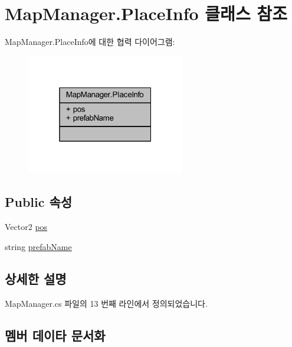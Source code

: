 \hypertarget{class_map_manager_1_1_place_info}{}\section{Map\+Manager.\+Place\+Info 클래스 참조}
\label{class_map_manager_1_1_place_info}


Map\+Manager.\+Place\+Info에 대한 협력 다이어그램\+:\nopagebreak
\begin{figure}[H]
\begin{center}
\leavevmode
\includegraphics[width=196pt]{class_map_manager_1_1_place_info__coll__graph}
\end{center}
\end{figure}
\subsection*{Public 속성}
\begin{DoxyCompactItemize}
\item 
Vector2 \hyperlink{class_map_manager_1_1_place_info_a892976a463c8f25b15b248220f10289e}{pos}
\item 
string \hyperlink{class_map_manager_1_1_place_info_a82ac5b1455ed7b78f7338784ac91fe1b}{prefab\+Name}
\end{DoxyCompactItemize}


\subsection{상세한 설명}


Map\+Manager.\+cs 파일의 13 번째 라인에서 정의되었습니다.



\subsection{멤버 데이타 문서화}
